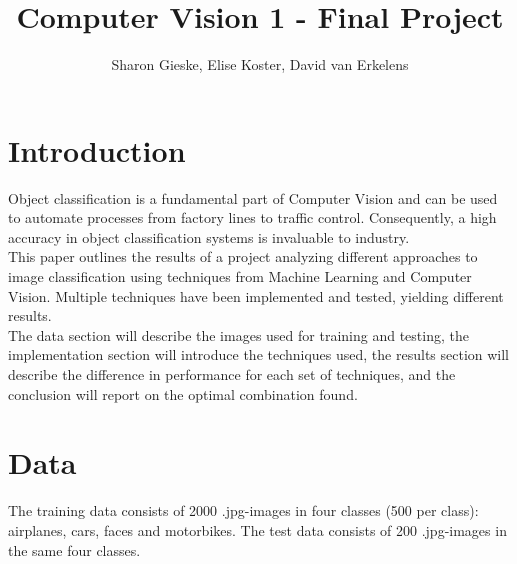 \documentclass[12pt,a4paper]{amsart}
\title{Computer Vision 1 - Final Project}
\author{
Sharon Gieske, Elise Koster, David van Erkelens
}
\date{}
\begin{document}
\maketitle
\section*{Introduction}
Object classification is a fundamental part of Computer Vision and can be used to automate processes from factory lines to traffic control. Consequently, a high accuracy in object classification systems is invaluable to industry.\\
This paper outlines the results of a project analyzing different approaches to image classification using techniques from Machine Learning and Computer Vision. Multiple techniques have been implemented and tested, yielding different results.\\
The data section will describe the images used for training and testing, the implementation section will introduce the techniques used, the results section will describe the difference in performance for each set of techniques, and the conclusion will report on the optimal combination found.

\section{Data}
The training data consists of 2000 .jpg-images in four classes (500 per class): airplanes, cars, faces and motorbikes. The test data consists of 200 .jpg-images in the same four classes.
\end{document}

